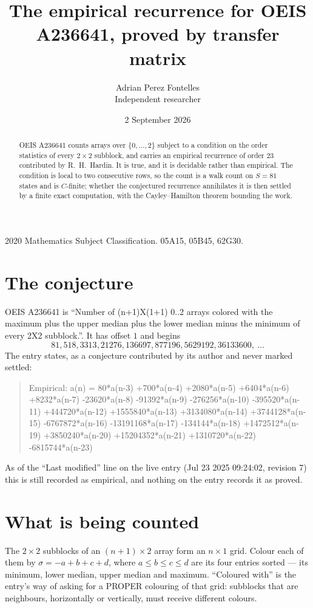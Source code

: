 \documentclass[11pt,a4paper]{article}
\title{The empirical recurrence for OEIS A236641, proved by transfer matrix}
\author{Adrian Perez Fontelles\\ \small Independent researcher}
\date{2 September 2026}
\theoremstyle{plain}
\theoremstyle{definition}
\begin{document}
\maketitle

\begin{abstract}
OEIS A236641 counts arrays over $\{0,\dots,2\}$ subject to a condition on the order
statistics of every $2\times2$ subblock, and carries an empirical recurrence of order
$23$ contributed by R.~H.~Hardin. It is true, and it is decidable rather than empirical.
The condition is local to two consecutive rows, so the count is a walk count on $S=81$
states and is $C$-finite; whether the conjectured recurrence annihilates it is then settled by
a finite exact computation, with the Cayley--Hamilton theorem bounding the work.
\end{abstract}

\noindent\small 2020 Mathematics Subject Classification. 05A15, 05B45, 62G30.\normalsize

\section{The conjecture}

OEIS A236641 is ``Number of (n+1)X(1+1) 0..2 arrays colored with the maximum plus the upper median plus the lower median minus the minimum of every 2X2 subblock.''. It has offset $1$ and begins
\[
81, 518, 3313, 21276, 136697, 877196, 5629192, 36133600,\ \dots
\]
The entry states, as a conjecture contributed by its author and never marked settled:
\begin{quote}
Empirical: a(n) = 80*a(n-3) +700*a(n-4) +2080*a(n-5) +6404*a(n-6) +8232*a(n-7) -23620*a(n-8) -91392*a(n-9) -276256*a(n-10) -395520*a(n-11) +444720*a(n-12) +1555840*a(n-13) +3134080*a(n-14) +3744128*a(n-15) -6767872*a(n-16) -13191168*a(n-17) -134144*a(n-18) +1472512*a(n-19) +3850240*a(n-20) +15204352*a(n-21) +1310720*a(n-22) -6815744*a(n-23)
\end{quote}
As of the ``Last modified'' line on the live entry (Jul 23 2025 09:24:02, revision 7) this is still
recorded as empirical, and nothing on the entry records it as proved.

\section{What is being counted}

The $2\times2$ subblocks of an $(n+1)\times2$ array form an
$n\times1$ grid. Colour each of them by $\sigma=-a+b+c+d$, where $a\le b\le c\le d$ are its four entries sorted --- its minimum, lower median, upper median and maximum. ``Coloured with'' is the entry's way of
asking for a PROPER colouring of that grid: subblocks that are neighbours, horizontally or
vertically, must receive different colours.
\end{document}
